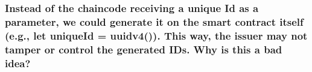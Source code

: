\documentclass[12pt,a4paper]{article}
\theoremstyle{definition}
\begin{document}
    \subsubsection*{Instead of the chaincode receiving a unique Id as a parameter, we could generate it on the smart contract itself (e.g., let uniqueId = uuidv4()). This way, the issuer may not tamper or control the generated IDs. Why is this a bad idea?}

    
    
\end{document}
